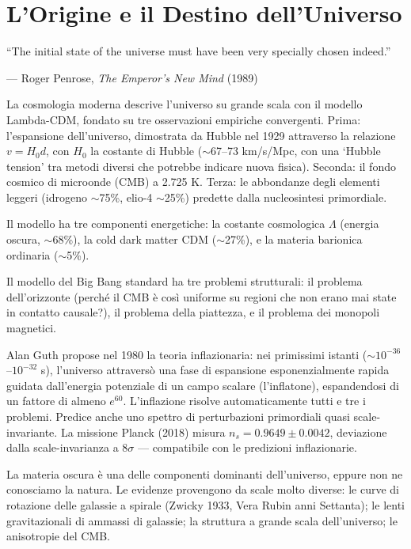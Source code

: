 \documentclass[12pt,a4paper,openany]{book}
\newcommand{\sezione}[1]{\vspace{1.2em}{\large\bfseries #1}\vspace{0.5em}\par}
\begin{document}
\chapter{L'Origine e il Destino dell'Universo}

\epigraph{``The initial state of the universe must have been very specially chosen indeed.''}{--- Roger Penrose, \textit{The Emperor's New Mind} (1989)}

\sezione{Il modello Lambda-CDM}

La cosmologia moderna descrive l'universo su grande scala con il modello Lambda-CDM, fondato su tre osservazioni empiriche convergenti. Prima: l'espansione dell'universo, dimostrata da Hubble nel 1929 attraverso la relazione $v = H_0 d$, con $H_0$ la costante di Hubble ($\sim$67--73 km/s/Mpc, con una `Hubble tension' tra metodi diversi che potrebbe indicare nuova fisica). Seconda: il fondo cosmico di microonde (CMB) a 2.725 K. Terza: le abbondanze degli elementi leggeri (idrogeno $\sim$75\%, elio-4 $\sim$25\%) predette dalla nucleosintesi primordiale.

Il modello ha tre componenti energetiche: la costante cosmologica $\Lambda$ (energia oscura, $\sim$68\%), la cold dark matter CDM ($\sim$27\%), e la materia barionica ordinaria ($\sim$5\%).

\sezione{L'inflazione cosmica}

Il modello del Big Bang standard ha tre problemi strutturali: il problema dell'orizzonte (perché il CMB è così uniforme su regioni che non erano mai state in contatto causale?), il problema della piattezza, e il problema dei monopoli magnetici.

Alan Guth propose nel 1980 la teoria inflazionaria: nei primissimi istanti ($\sim 10^{-36}$--$10^{-32}$ s), l'universo attraversò una fase di espansione esponenzialmente rapida guidata dall'energia potenziale di un campo scalare (l'inflatone), espandendosi di un fattore di almeno $e^{60}$. L'inflazione risolve automaticamente tutti e tre i problemi. Predice anche uno spettro di perturbazioni primordiali quasi scale-invariante. La missione Planck (2018) misura $n_s = 0.9649 \pm 0.0042$, deviazione dalla scale-invarianza a $8\sigma$ — compatibile con le predizioni inflazionarie.

\sezione{La materia oscura}

La materia oscura è una delle componenti dominanti dell'universo, eppure non ne conosciamo la natura. Le evidenze provengono da scale molto diverse: le curve di rotazione delle galassie a spirale (Zwicky 1933, Vera Rubin anni Settanta); le lenti gravitazionali di ammassi di galassie; la struttura a grande scala dell'universo; le anisotropie del CMB.
\end{document}

